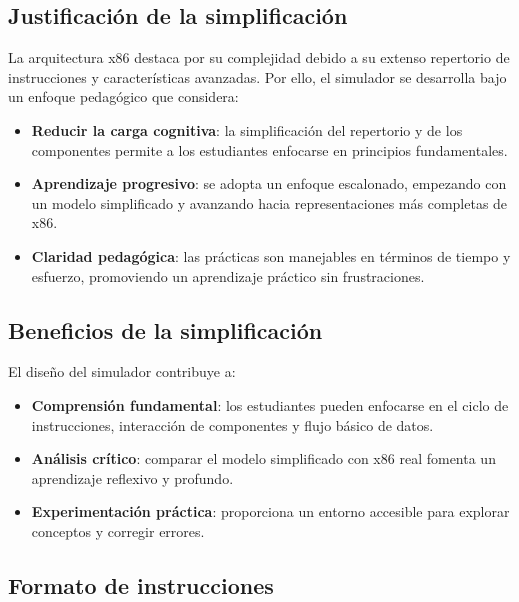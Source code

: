 \documentclass[12pt,oneside]{templates/unerthesis}
\providecommand{\tightlist}{%
  \setlength{\itemsep}{0pt}\setlength{\parskip}{0pt}}
\begin{document}
\hypertarget{justificaciuxf3n-de-la-simplificaciuxf3n}{%
\subsection{Justificación de la simplificación}\label{justificaciuxf3n-de-la-simplificaciuxf3n}}

La arquitectura x86 destaca por su complejidad debido a su extenso repertorio de instrucciones y características avanzadas. Por ello, el simulador se desarrolla bajo un enfoque pedagógico que considera:

\begin{itemize}
\tightlist
\item
  \textbf{Reducir la carga cognitiva}: la simplificación del repertorio y de los componentes permite a los estudiantes enfocarse en principios fundamentales.
\item
  \textbf{Aprendizaje progresivo}: se adopta un enfoque escalonado, empezando con un modelo simplificado y avanzando hacia representaciones más completas de x86.
\item
  \textbf{Claridad pedagógica}: las prácticas son manejables en términos de tiempo y esfuerzo, promoviendo un aprendizaje práctico sin frustraciones.
\end{itemize}

\hypertarget{beneficios-de-la-simplificaciuxf3n}{%
\subsection{Beneficios de la simplificación}\label{beneficios-de-la-simplificaciuxf3n}}

El diseño del simulador contribuye a:

\begin{itemize}
\tightlist
\item
  \textbf{Comprensión fundamental}: los estudiantes pueden enfocarse en el ciclo de instrucciones, interacción de componentes y flujo básico de datos.
\item
  \textbf{Análisis crítico}: comparar el modelo simplificado con x86 real fomenta un aprendizaje reflexivo y profundo.
\item
  \textbf{Experimentación práctica}: proporciona un entorno accesible para explorar conceptos y corregir errores.
\end{itemize}

\hypertarget{formato-de-instrucciones}{%
\subsection{Formato de instrucciones}\label{formato-de-instrucciones}}
\end{document}
